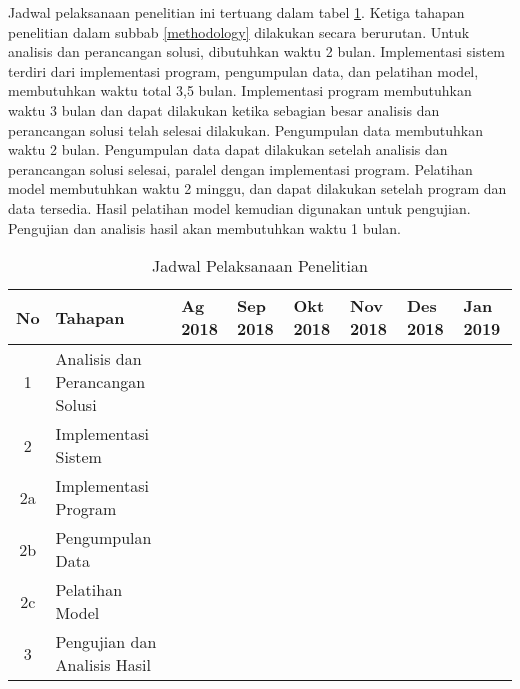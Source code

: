 Jadwal pelaksanaan penelitian ini tertuang dalam tabel \ref{tab-schedule}. Ketiga tahapan penelitian dalam subbab \ref{methodology} dilakukan secara berurutan. Untuk analisis dan perancangan solusi, dibutuhkan waktu 2 bulan.  Implementasi sistem terdiri dari implementasi program, pengumpulan data, dan pelatihan model, membutuhkan waktu total 3,5 bulan. Implementasi program membutuhkan waktu 3 bulan dan dapat dilakukan ketika sebagian besar analisis dan perancangan solusi telah selesai dilakukan. Pengumpulan data membutuhkan waktu 2 bulan. Pengumpulan data dapat dilakukan setelah analisis dan perancangan solusi selesai, paralel dengan implementasi program. Pelatihan model membutuhkan waktu 2 minggu, dan dapat dilakukan setelah program dan data tersedia. Hasil pelatihan model kemudian digunakan untuk pengujian. Pengujian dan analisis hasil akan membutuhkan waktu 1 bulan.

\begin{table}[h]
	\centering
    \caption{Jadwal Pelaksanaan Penelitian}\label{tab-schedule}
	\begin{tabular}{ |c|l|p{5px}|p{5px}|p{5px}|p{5px}|p{5px}|p{5px}|p{5px}|p{5px}|p{5px}|p{5px}|p{5px}|p{5px}| } 
	\hline
	No & Tahapan & \multicolumn{2}{p{10px}|}{Ag 2018} & \multicolumn{2}{p{10px}|}{Sep 2018} & \multicolumn{2}{p{10px}|}{Okt 2018} & \multicolumn{2}{p{10px}|}{Nov 2018} & \multicolumn{2}{p{10px}|}{Des 2018}  & \multicolumn{2}{p{10px}|}{Jan 2019} \\
	\hline
	1 & Analisis dan Perancangan Solusi & \fillcell & \fillcell & \fillcell & \fillcell & & & & & & & & \\
	\hline
	2 & Implementasi Sistem& & & & \fillcell & \fillcell &\fillcell &\fillcell &\fillcell &\fillcell &\fillcell & & \\
	\hline
	2a & \quad Implementasi Program & & & & \fillcell & \fillcell &\fillcell &\fillcell &\fillcell &\fillcell & & & \\
	\hline
	2b & \quad Pengumpulan Data & & & & & \fillcell &\fillcell &\fillcell &\fillcell & & & & \\
	\hline
	2c & \quad Pelatihan Model & & & & &  & & & & &\fillcell & & \\
	\hline
	3 & Pengujian dan Analisis Hasil & & & & &  & & & & & &\fillcell &\fillcell \\
	\hline
	\end{tabular}
	
\end{table}